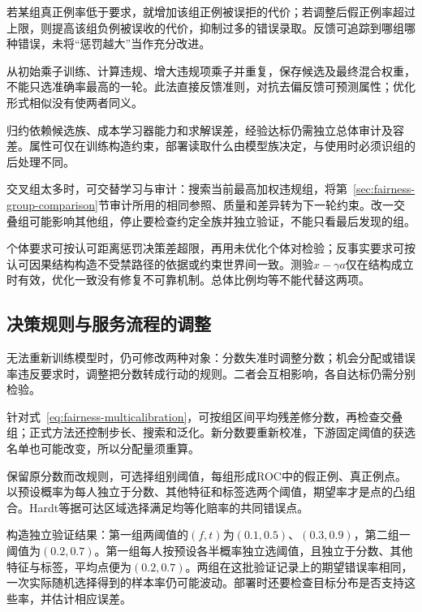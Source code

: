 若某组真正例率低于要求，就增加该组正例被误拒的代价；若调整后假正例率超过上限，则提高该组负例被误收的代价，抑制过多的错误录取。反馈可追踪到哪组哪种错误，未将“惩罚越大”当作充分改进。

从初始乘子训练、计算违规、增大违规项乘子并重复，保存候选及最终混合权重，不能只选准确率最高的一轮。此法直接反馈准则，对抗去偏反馈可预测属性；优化形式相似没有使两者同义。

归约依赖候选族、成本学习器能力和求解误差，经验达标仍需独立总体审计及容差。属性可仅在训练构造约束，部署读取什么由模型族决定，与使用时必须识组的后处理不同。

交叉组太多时，可交替学习与审计：搜索当前最高加权违规组，将第~\ref{sec:fairness-group-comparison}节审计所用的相同参照、质量和差异转为下一轮约束。改一交叠组可能影响其他组，停止要检查约定全族并独立验证，不能只看最后发现的组。

个体要求可按认可距离惩罚决策差超限，再用未优化个体对检验；反事实要求可按认可因果结构构造不受禁路径的依据或约束世界间一致。测验$x-\gamma a$仅在结构成立时有效，优化一致没有修复不可靠机制。总体比例均等不能代替这两项。

\subsection{决策规则与服务流程的调整}
\label{sec:fairness-decision-intervention}

无法重新训练模型时，仍可修改两种对象：分数失准时调整分数；机会分配或错误率违反要求时，调整把分数转成行动的规则。二者会互相影响，各自达标仍需分别检验。

针对式~\eqref{eq:fairness-multicalibration}，可按组区间平均残差修分数，再检查交叠组；正式方法还控制步长、搜索和泛化。新分数要重新校准，下游固定阈值的获选名单也可能改变，所以分配量须重算。

保留原分数而改规则，可选择组别阈值，每组形成ROC中的假正例、真正例点。以预设概率为每人独立于分数、其他特征和标签选两个阈值，期望率才是点的凸组合。Hardt等据可达区域选择满足均等化赔率的共同错误点。

\begin{example}[随机化如何补出共同错误率]
\label{ex:fairness-random-threshold}
构造独立验证结果：第一组两阈值的$(f,t)$为$(0.1,0.5)$、$(0.3,0.9)$，第二组一阈值为$(0.2,0.7)$。第一组每人按预设各半概率独立选阈值，且独立于分数、其他特征与标签，平均点便为$(0.2,0.7)$。两组在这批验证记录上的期望错误率相同，一次实际随机选择得到的样本率仍可能波动。部署时还要检查目标分布是否支持这些率，并估计相应误差。
\end{example}

